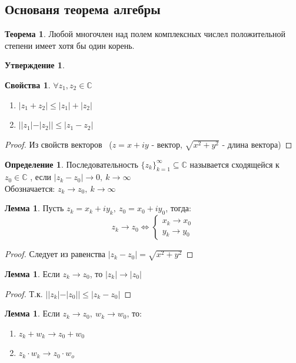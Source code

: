 \documentclass[a4paper, 12pt]{article}
\newcommand\tab[1][.5cm]{\hspace*{#1}}
\newcounter{lemcount}
\newcounter{lemcount2}
\theoremstyle{definition}
\newtheorem*{definition}{Определение}
\newtheorem*{theorem}{Теорема}
\newtheorem*{subtheorem}{Утверждение}
\newtheorem*{properties}{Свойства}
\newtheorem{lemmanum}[lemcount]{Лемма}
\begin{document}
  \subsection{Основаня теорема алгебры}
  \begin{theorem}
    Любой многочлен над полем комплексных числел положительной степени имеет хотя бы один корень.
  \end{theorem}
  \begin{subtheorem}\tab
    \begin{properties}\tab
      $\forall z_1, z_2 \in \mathbb{C}$
      \begin{enumerate} 
        \item $|z_1+z_2|\leq |z_1| + |z_2|$
        \item $||z_1|-|z_2||\leq |z_1-z_2|$ 
      \end{enumerate}
      \begin{proof}
        Из свойств векторов \ ($z = x+iy$ - вектор, $\sqrt{x^2+y^2}$ - длина вектора)
      \end{proof} 
    \end{properties}
  \end{subtheorem}
  \begin{definition}
    Последовательность $\{z_k\}_{k=1}^{\infty} \subseteq \mathbb{C}$ называется сходящейся к $z_0 \in \mathbb{C}$ , если $|z_k-z_0| \to 0, \ k\to \infty$\\
    Обозначается: $z_k \to z_0, \ k\to \infty$ 
  \end{definition} 
  \setcounter{lemcount}{0}
  \begin{lemmanum}
    Пусть $z_k = x_k+iy_k, \ z_0 = x_0 + iy_0$, тогда:
    $$z_k \to z_0 \Longleftrightarrow \begin{cases}
      x_k \to x_0 \\
      y_k \to y_0
    \end{cases}$$  
  \end{lemmanum} 
  \begin{proof}
    Следует из равенства $|z_k-z_0| = \sqrt{x^2+y^2}$ 
  \end{proof} 
  \begin{lemmanum}
    Если $z_k \to z_0$, то $|z_k| \to |z_0|$  
  \end{lemmanum} 
  \begin{proof}
    Т.к. $||z_k|-|z_0||\leq |z_k-z_0|$ 
  \end{proof} 
  \begin{lemmanum}
    Если $z_k \to z_0, \ w_k \to w_0$, то:
    \begin{enumerate}
      \item $z_k + w_k \to z_0 + w_0$
      \item $z_k \cdot w_k \to z_0 \cdot w_o$  
    \end{enumerate}
  \end{lemmanum} 
\end{document}
